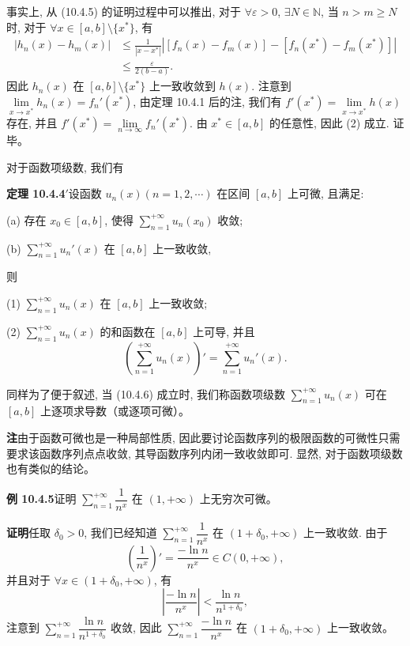 \documentclass[UTF8, 12pt, fontset=fandol, oneside]{ctexart}
\begin{document}
事实上, 从 (10.4.5) 的证明过程中可以推出, 对于 $\forall\varepsilon>0$, $\exists N\in\mathbb N$, 当 $n>m\geq N$ 时, 对于 $\forall x\in[a,b]\setminus\{x^*\}$, 有
\[
\begin{aligned}
  |h_n(x)-h_m(x)|
  &\leq \frac1{|x-x^*|}\left|[f_n(x)-f_m(x)]-[f_n(x^*)-f_m(x^*)]\right|\\
  &\leq\frac{\varepsilon}{2(b-a)}.
\end{aligned}
\]
因此 $h_n(x)$ 在 $[a,b]\setminus\{x^*\}$ 上一致收敛到 $h(x)$. 注意到 $\lim\limits_{x\to x^*}h_n(x)=f_n'(x^*)$, 由定理 10.4.1 后的注, 我们有 $f'(x^*)=\lim\limits_{x\to x^*}h(x)$ 存在, 并且 $f'(x^*)=\lim\limits_{n\to\infty}f_n'(x^*)$. 由 $x^*\in[a,b]$ 的任意性, 因此 (2) 成立. 证毕。

对于函数项级数, 我们有

\noindent\textbf{定理 10.4.4$'$}\quad 设函数 $u_n(x)(n=1,2,\cdots)$ 在区间 $[a,b]$ 上可微, 且满足:

(a) 存在 $x_0\in[a,b]$, 使得 $\sum\limits_{n=1}^{+\infty}u_n(x_0)$ 收敛;

(b) $\sum\limits_{n=1}^{+\infty}u_n'(x)$ 在 $[a,b]$ 上一致收敛,

则

(1) $\sum\limits_{n=1}^{+\infty}u_n(x)$ 在 $[a,b]$ 上一致收敛;

(2) $\sum\limits_{n=1}^{+\infty}u_n(x)$ 的和函数在 $[a,b]$ 上可导, 并且
\begin{equation}
  \left(\sum_{n=1}^{+\infty}u_n(x)\right)'
  =\sum_{n=1}^{+\infty}u_n'(x).
  \tag{10.4.6}
\end{equation}

同样为了便于叙述, 当 (10.4.6) 成立时, 我们称函数项级数 $\sum\limits_{n=1}^{+\infty}u_n(x)$ 可在 $[a,b]$ 上逐项求导数（或逐项可微）。

\noindent\textbf{注}\quad 由于函数可微也是一种局部性质, 因此要讨论函数序列的极限函数的可微性只需要求该函数序列点点收敛, 其导函数序列内闭一致收敛即可. 显然, 对于函数项级数也有类似的结论。

\noindent\textbf{例 10.4.5}\quad 证明 $\sum\limits_{n=1}^{+\infty}\dfrac1{n^x}$ 在 $(1,+\infty)$ 上无穷次可微。

\noindent\textbf{证明}\quad 任取 $\delta_0>0$, 我们已经知道 $\sum\limits_{n=1}^{+\infty}\dfrac1{n^x}$ 在 $(1+\delta_0,+\infty)$ 上一致收敛. 由于
\[
  \left(\frac1{n^x}\right)'=\frac{-\ln n}{n^x}\in C(0,+\infty),
\]
并且对于 $\forall x\in(1+\delta_0,+\infty)$, 有
\[
  \left|\frac{-\ln n}{n^x}\right|<\frac{\ln n}{n^{1+\delta_0}},
\]
注意到 $\sum\limits_{n=1}^{+\infty}\dfrac{\ln n}{n^{1+\delta_0}}$ 收敛, 因此 $\sum\limits_{n=1}^{+\infty}\dfrac{-\ln n}{n^x}$ 在 $(1+\delta_0,+\infty)$ 上一致收敛。
\end{document}
